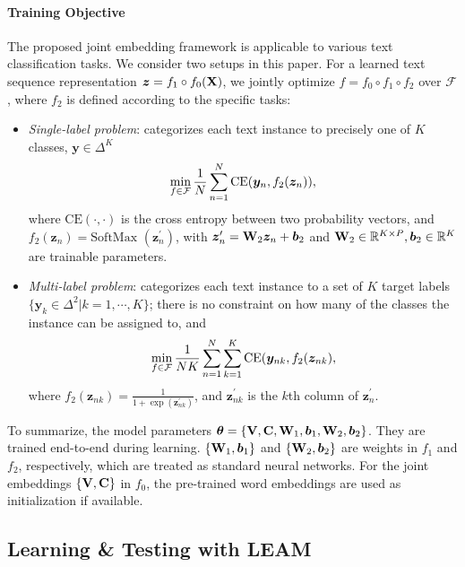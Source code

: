 \documentclass[11pt,a4paper]{article}
\newcommand{\beq}{\vspace{0mm}\begin{equation}}
\newcommand{\eeq}{\vspace{0mm}\end{equation}}
\newcommand{\Cmat}{{\bf C}}
\newcommand{\Vmat}[0]{{{\bf V}}}
\newcommand{\Wmat}[0]{{{\bf W}}}
\newcommand{\Xmat}[0]{{{\bf X}}}
\newcommand{\bv}[0]{{\boldsymbol{b}}}
\newcommand{\yv}{\boldsymbol{y}}
\newcommand{\zv}{\boldsymbol{z}}
\newcommand{\thetav}{\boldsymbol{\theta}}
\newcommand{\R}{\mathbb{R}}
\newcommand{\Fcal}{\mathcal{F}}
\begin{document}
\paragraph{Training Objective}
The proposed joint embedding framework is applicable to various text classification tasks. We consider two setups in this paper. For a learned text sequence representation $\zv = f_1 \circ f_0(\Xmat)$, we jointly optimize $f=f_0 \circ f_1 \circ f_2$ over $\Fcal$, where $f_2$ is defined according to the specific tasks:
\begin{itemize}
	\item {\em Single-label problem}: categorizes each text instance to precisely one of $K$ classes, $\yv \in \Delta^K$
	\beq
	\min_{f \in \Fcal} \frac{1}{N} \sum_{n=1}^{N}
	\mbox{CE} (\yv_{n}, f_2(\zv_{n}) ),
	\label{eq:objective_multiclass}
	\eeq
	where $\mbox{CE}(\cdot, \cdot)$ is the cross entropy between two probability vectors, 
	and $f_2(\zv_n)= \mbox{SoftMax }( \zv_n^{\prime} ) $, with $\zv_n^{\prime} = \Wmat_2 \zv_{n} + \bv_2$ 
	and $ \Wmat_2 \in \R^{K \times P} ,  \bv_2 \in \R^K$ are trainable parameters.
\item {\em Multi-label problem}: categorizes each text instance to a set of $K$ target labels $\{\yv_k \in \Delta^2 | k=1,\cdots, K\}$; there is no constraint on how many of the classes the instance can be assigned to, and
	\beq
	\min_{f \in \Fcal} \frac{1}{NK} \sum_{n=1}^{N}  \sum_{k=1}^{K} 
	\mbox{CE} (\yv_{nk}, f_{2}(\zv_{nk} ),
	\label{eq:objective_multilabel}
	\eeq
where $f_{2}(\zv_{nk}) = \frac{1}{1+\exp( \zv_{nk}^{\prime}  ) }$, and $\zv_{nk}^{\prime}$ is the $k$th column of $ \zv_{n}^{\prime}$.
\end{itemize}
To summarize, the model parameters 
$\thetav = \{\Vmat, \Cmat, \Wmat_1, \bv_1, \Wmat_2, \bv_2\}$. They are trained end-to-end during learning. $\{ \Wmat_1, \bv_1\}$ and $\{\Wmat_2, \bv_2\}$ are weights in $f_1$ and $f_2$, respectively, which are treated as standard neural networks. For the joint embeddings $\{\Vmat, \Cmat\}$ in $f_0$, the pre-trained word embeddings are used as initialization if available.

\subsection{Learning \& Testing with LEAM}
\end{document}
